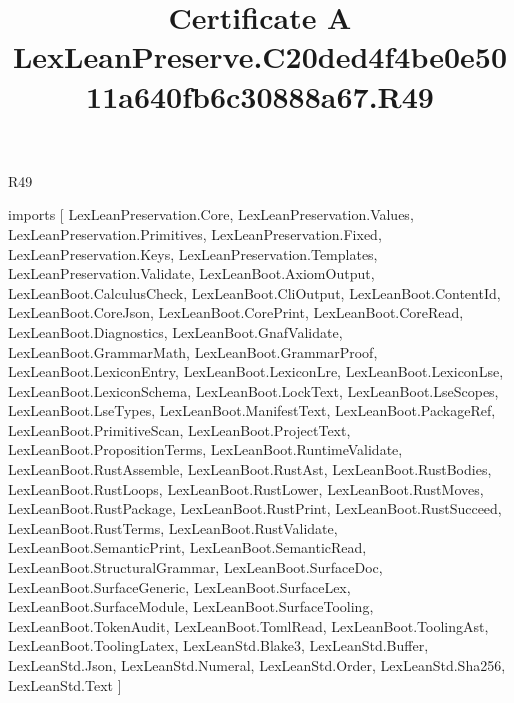 \begin{lexlean}{R49}
\title{Certificate A LexLeanPreserve.C20ded4f4be0e5011a640fb6c30888a67.R49}
\begin{coremodule}
imports [
  LexLeanPreservation.Core,
  LexLeanPreservation.Values,
  LexLeanPreservation.Primitives,
  LexLeanPreservation.Fixed,
  LexLeanPreservation.Keys,
  LexLeanPreservation.Templates,
  LexLeanPreservation.Validate,
  LexLeanBoot.AxiomOutput,
  LexLeanBoot.CalculusCheck,
  LexLeanBoot.CliOutput,
  LexLeanBoot.ContentId,
  LexLeanBoot.CoreJson,
  LexLeanBoot.CorePrint,
  LexLeanBoot.CoreRead,
  LexLeanBoot.Diagnostics,
  LexLeanBoot.GnafValidate,
  LexLeanBoot.GrammarMath,
  LexLeanBoot.GrammarProof,
  LexLeanBoot.LexiconEntry,
  LexLeanBoot.LexiconLre,
  LexLeanBoot.LexiconLse,
  LexLeanBoot.LexiconSchema,
  LexLeanBoot.LockText,
  LexLeanBoot.LseScopes,
  LexLeanBoot.LseTypes,
  LexLeanBoot.ManifestText,
  LexLeanBoot.PackageRef,
  LexLeanBoot.PrimitiveScan,
  LexLeanBoot.ProjectText,
  LexLeanBoot.PropositionTerms,
  LexLeanBoot.RuntimeValidate,
  LexLeanBoot.RustAssemble,
  LexLeanBoot.RustAst,
  LexLeanBoot.RustBodies,
  LexLeanBoot.RustLoops,
  LexLeanBoot.RustLower,
  LexLeanBoot.RustMoves,
  LexLeanBoot.RustPackage,
  LexLeanBoot.RustPrint,
  LexLeanBoot.RustSucceed,
  LexLeanBoot.RustTerms,
  LexLeanBoot.RustValidate,
  LexLeanBoot.SemanticPrint,
  LexLeanBoot.SemanticRead,
  LexLeanBoot.StructuralGrammar,
  LexLeanBoot.SurfaceDoc,
  LexLeanBoot.SurfaceGeneric,
  LexLeanBoot.SurfaceLex,
  LexLeanBoot.SurfaceModule,
  LexLeanBoot.SurfaceTooling,
  LexLeanBoot.TokenAudit,
  LexLeanBoot.TomlRead,
  LexLeanBoot.ToolingAst,
  LexLeanBoot.ToolingLatex,
  LexLeanStd.Blake3,
  LexLeanStd.Buffer,
  LexLeanStd.Json,
  LexLeanStd.Numeral,
  LexLeanStd.Order,
  LexLeanStd.Sha256,
  LexLeanStd.Text
]


\end{coremodule}
\end{lexlean}
